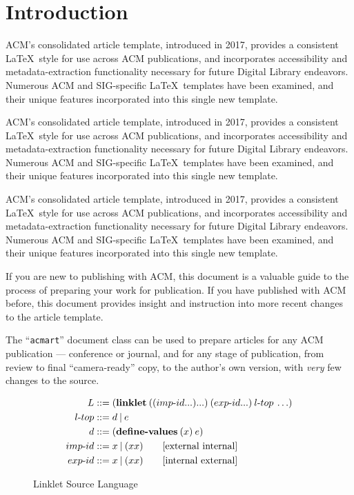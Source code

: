 \documentclass[sigplan,screen,anonymous]{acmart}
\def\dash {\text{-}}
\begin{document}
%
\maketitle

\section{Introduction}
ACM's consolidated article template, introduced in 2017, provides a consistent \LaTeX\ style for use across ACM publications, and incorporates accessibility and metadata-extraction functionality necessary for future Digital Library endeavors. Numerous ACM and SIG-specific \LaTeX\ templates have been examined, and their unique features incorporated into this single new template.

ACM's consolidated article template, introduced in 2017, provides a consistent \LaTeX\ style for use across ACM publications, and incorporates accessibility and metadata-extraction functionality necessary for future Digital Library endeavors. Numerous ACM and SIG-specific \LaTeX\ templates have been examined, and their unique features incorporated into this single new template.

ACM's consolidated article template, introduced in 2017, provides a consistent \LaTeX\ style for use across ACM publications, and incorporates accessibility and metadata-extraction functionality necessary for future Digital Library endeavors. Numerous ACM and SIG-specific \LaTeX\ templates have been examined, and their unique features incorporated into this single new template.


If you are new to publishing with ACM, this document is a valuable guide to the process of preparing your work for publication. If you have published with ACM before, this document provides insight and instruction into more recent changes to the article template.

The ``\verb|acmart|'' document class can be used to prepare articles for any ACM publication --- conference or journal, and for any stage of publication, from review to final ``camera-ready'' copy, to the author's own version, with {\it very} few changes to the source.

\begin{figure}[tbp]
  \begin{align*}
    L  &::= (\textbf{linklet}\:((imp\dash id ...) ...)\:(exp\dash id ...)\:l\dash top\:\ldots)\\
    l\dash top &::= d\:|\:e \\
    d &::= (\textbf{define\dash values}\:(x)\:e) \\
    imp\dash id &::= x\:|\:(x x) \tag*{[external internal]}\\
    exp\dash id &::= x\:|\:(x x) \tag*{[internal external]}
  \end{align*}
  \caption{Linklet Source Language}
  \label{fig:linklet-source}
\end{figure}
\end{document}
